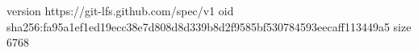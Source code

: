 version https://git-lfs.github.com/spec/v1
oid sha256:fa95a1ef1ed19ecc38e7d808d8d339b8d2f9585bf530784593eecaff113449a5
size 6768
